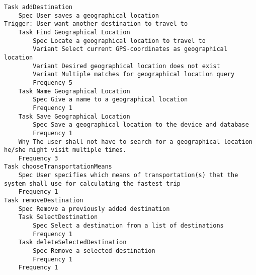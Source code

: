 

\begin{lstlisting}
Task addDestination
	Spec User saves a geographical location
Trigger: User want another destination to travel to
	Task Find Geographical Location
		Spec Locate a geographical location to travel to
		Variant Select current GPS-coordinates as geographical location
		Variant Desired geographical location does not exist
		Variant Multiple matches for geographical location query
		Frequency 5
	Task Name Geographical Location
		Spec Give a name to a geographical location
		Frequency 1
	Task Save Geographical Location
		Spec Save a geographical location to the device and database
		Frequency 1
	Why The user shall not have to search for a geographical location he/she might visit multiple times.
	Frequency 3
Task chooseTransportationMeans
	Spec User specifies which means of transportation(s) that the system shall use for calculating the fastest trip
	Frequency 1
Task removeDestination
	Spec Remove a previously added destination
	Task SelectDestination
		Spec Select a destination from a list of destinations
		Frequency 1
	Task deleteSelectedDestination
		Spec Remove a selected destination
		Frequency 1
	Frequency 1

\end{lstlisting}
